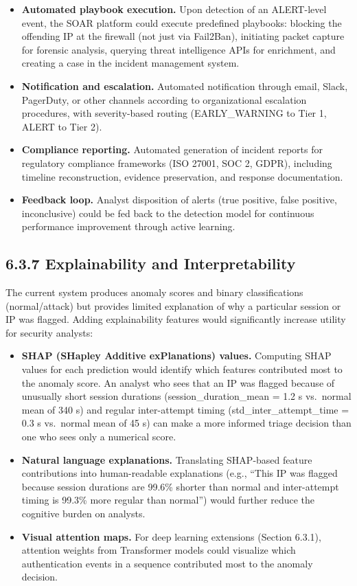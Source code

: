 \documentclass[
  a4paper]{report}
\providecommand{\tightlist}{%
  \setlength{\itemsep}{0pt}\setlength{\parskip}{0pt}}
\begin{document}
\begin{itemize}
\tightlist
\item
  \textbf{Automated playbook execution.} Upon detection of an
  ALERT-level event, the SOAR platform could execute predefined
  playbooks: blocking the offending IP at the firewall (not just via
  Fail2Ban), initiating packet capture for forensic analysis, querying
  threat intelligence APIs for enrichment, and creating a case in the
  incident management system.
\item
  \textbf{Notification and escalation.} Automated notification through
  email, Slack, PagerDuty, or other channels according to organizational
  escalation procedures, with severity-based routing (EARLY\_WARNING to
  Tier 1, ALERT to Tier 2).
\item
  \textbf{Compliance reporting.} Automated generation of incident
  reports for regulatory compliance frameworks (ISO 27001, SOC 2, GDPR),
  including timeline reconstruction, evidence preservation, and response
  documentation.
\item
  \textbf{Feedback loop.} Analyst disposition of alerts (true positive,
  false positive, inconclusive) could be fed back to the detection model
  for continuous performance improvement through active learning.
\end{itemize}

\subsection{6.3.7 Explainability and
Interpretability}\label{explainability-and-interpretability}

The current system produces anomaly scores and binary classifications
(normal/attack) but provides limited explanation of why a particular
session or IP was flagged. Adding explainability features would
significantly increase utility for security analysts:

\begin{itemize}
\tightlist
\item
  \textbf{SHAP (SHapley Additive exPlanations) values.} Computing SHAP
  values for each prediction would identify which features contributed
  most to the anomaly score. An analyst who sees that an IP was flagged
  because of unusually short session durations (session\_duration\_mean
  = 1.2 s vs.~normal mean of 340 s) and regular inter-attempt timing
  (std\_inter\_attempt\_time = 0.3 s vs.~normal mean of 45 s) can make a
  more informed triage decision than one who sees only a numerical
  score.
\item
  \textbf{Natural language explanations.} Translating SHAP-based feature
  contributions into human-readable explanations (e.g., ``This IP was
  flagged because session durations are 99.6\% shorter than normal and
  inter-attempt timing is 99.3\% more regular than normal'') would
  further reduce the cognitive burden on analysts.
\item
  \textbf{Visual attention maps.} For deep learning extensions (Section
  6.3.1), attention weights from Transformer models could visualize
  which authentication events in a sequence contributed most to the
  anomaly decision.
\end{itemize}
\end{document}
